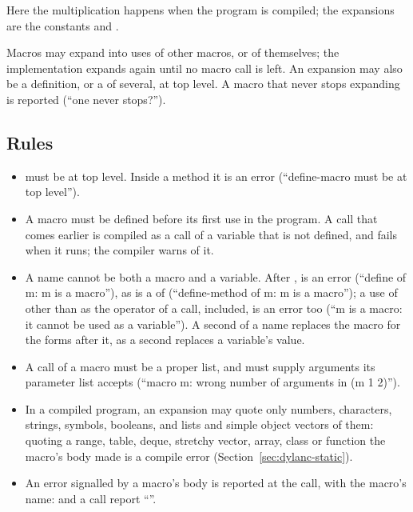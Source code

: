 Here the multiplication happens when the program is compiled; the
expansions are the constants  and .

Macros may expand into uses of other macros, or of themselves; the
implementation expands again until no macro call is left. An expansion
may also be a definition, or a  of several, at top level. A
macro that never stops expanding is reported (``one never stops?'').

\subsection{Rules}

\begin{itemize}
\item {} must be at top level. Inside a method it is
  an error (``define-macro must be at top level'').
\item A macro must be defined before its first use in the program. A
  call that comes earlier is compiled as a call of a variable that is not
  defined, and fails when it runs; the compiler warns of it.
\item A name cannot be both a macro and a variable. After
  ,  is an error
  (``define of m: m is a macro''), as is a  of
   (``define-method of m: m is a macro''); a use of 
  other than as the operator of a call,  included, is an
  error too (``m is a macro: it cannot be used as a variable''). A second
   of a name replaces the macro for the forms after
  it, as a second  replaces a variable's value.
\item A call of a macro must be a proper list, and must supply arguments
  its parameter list accepts (``macro m: wrong number of arguments in
  (m 1 2)'').
\item In a compiled program, an expansion may quote only numbers,
  characters, strings, symbols, booleans, and lists and simple object
  vectors of them: quoting a range, table, deque, stretchy vector,
  array, class or function the macro's body made is a compile error
  (Section~\ref{sec:dylanc-static}).
\item An error signalled by a macro's body is reported at the call, with
  the macro's name:  and a call  report
  ``''.
\end{itemize}


